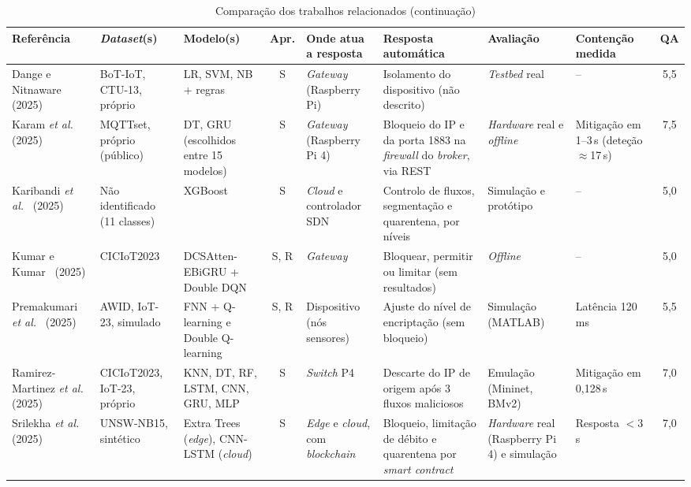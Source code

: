 \documentclass[conference,a4paper]{IEEEtran}
\newcommand{\nao}{--}            %
\begin{document}
\begin{table}[p]
\caption{Comparação dos trabalhos relacionados (continuação)}\label{tab:comparacao2}
\centering\scriptsize
\setlength{\tabcolsep}{2.5pt}
\renewcommand{\arraystretch}{0.97}
\begin{tabular}{@{}>{\raggedright\arraybackslash}p{}>{\raggedright\arraybackslash}p{}>{\raggedright\arraybackslash}p{}c>{\raggedright\arraybackslash}p{}>{\raggedright\arraybackslash}p{}>{\raggedright\arraybackslash}p{}>{\raggedright\arraybackslash}p{}c@{}}
\toprule
Referência & \textit{Dataset}(s) & Modelo(s) & Apr. & Onde atua a resposta & Resposta automática & Avaliação & Contenção medida & QA \\
\midrule
Dange e Nitnaware~\cite{dange2025dual} (2025) & BoT-IoT, CTU-13, próprio & LR, SVM, NB + regras & S & \textit{Gateway} (Raspberry Pi) & Isolamento do dispositivo (não descrito) & \textit{Testbed} real & \nao & 5,5 \\
Karam \textit{et al.}~\cite{karam2025isaaf} (2025) & MQTTset, próprio (público) & DT, GRU (escolhidos entre 15 modelos) & S & \textit{Gateway} (Raspberry Pi 4) & Bloqueio do IP e da porta 1883 na \textit{firewall} do \textit{broker}, via REST & \textit{Hardware} real e \textit{offline} & Mitigação em 1--3\,s (deteção $\approx$17\,s) & 7,5 \\
Karibandi \textit{et al.}~\cite{karibandi2025cyberdome} (2025) & Não identificado (11 classes) & XGBoost & S & \textit{Cloud} e controlador SDN & Controlo de fluxos, segmentação e quarentena, por níveis & Simulação e protótipo & \nao & 5,0 \\
Kumar e Kumar~\cite{kumar2025advanced} (2025) & CICIoT2023 & DCSAtten-EBiGRU + Double DQN & S, R & \textit{Gateway} & Bloquear, permitir ou limitar (sem resultados) & \textit{Offline} & \nao & 5,0 \\
Premakumari \textit{et al.}~\cite{premakumari2025qlearning} (2025) & AWID, IoT-23, simulado & FNN + Q-learning e Double Q-learning & S, R & Dispositivo (nós sensores) & Ajuste do nível de encriptação (sem bloqueio) & Simulação (MATLAB) & Latência 120\,ms & 5,5 \\
Ramirez-Martinez \textit{et al.}~\cite{ramirezmartinez2025p4} (2025) & CICIoT2023, IoT-23, próprio & KNN, DT, RF, LSTM, CNN, GRU, MLP & S & \textit{Switch} P4 & Descarte do IP de origem após 3 fluxos maliciosos & Emulação (Mininet, BMv2) & Mitigação em 0,128\,s & 7,0 \\
Srilekha \textit{et al.}~\cite{srilekha2025hybrid} (2025) & UNSW-NB15, sintético & Extra Trees (\textit{edge}), CNN-LSTM (\textit{cloud}) & S & \textit{Edge} e \textit{cloud}, com \textit{blockchain} & Bloqueio, limitação de débito e quarentena por \textit{smart contract} & \textit{Hardware} real (Raspberry Pi 4) e simulação & Resposta $<$3\,s & 7,0 \\

\end{tabular}
\end{table}
\end{document}
